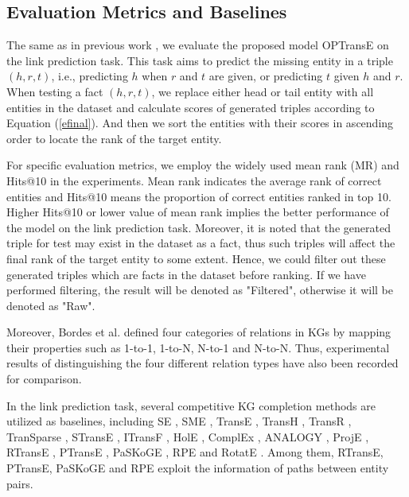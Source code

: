 \documentclass[11pt,a4paper]{article}
\begin{document}
\subsection{Evaluation Metrics and Baselines}

The same as in previous work
\cite{bordes2013translating,nguyen2016stranse}, we evaluate the
proposed model OPTransE on the link prediction task. This task aims
to predict the missing entity in a triple $(h,r,t)$, i.e.,
predicting ${h}$ when ${r}$ and ${t}$ are given, or predicting ${t}$
given ${h}$ and ${r}$. When testing a fact $(h,r,t)$, we replace
either head or tail entity with all entities in the dataset and
calculate scores of generated triples according to Equation
(\ref{efinal}). And then we sort the entities with their scores in
ascending order to locate the rank of the target entity.

For specific evaluation metrics, we employ the widely used mean rank
(MR) and Hits@10 in the experiments. Mean rank indicates the average
rank of correct entities and Hits@10 means the proportion of correct
entities ranked in top 10. Higher Hits@10 or lower value of mean
rank implies the better performance of the model on the link
prediction task. Moreover, it is noted that the generated triple for
test may exist in the dataset as a fact, thus such triples will
affect the final rank of the target entity to some extent. Hence, we
could filter out these generated triples which are facts in the
dataset before ranking. If we have performed filtering, the result
will be denoted as "Filtered", otherwise it will be denoted as
"Raw".

Moreover, Bordes et al.  defined
four categories of relations in KGs by mapping their properties such
as 1-to-1, 1-to-N, N-to-1 and N-to-N. Thus, experimental results of
distinguishing  the four different relation types have also been
recorded for comparison.

In the link prediction task, several competitive KG completion
methods are utilized as baselines, including SE
\cite{bordes2011learning}, SME \cite{bordes2014semantic}, TransE
\cite{bordes2013translating}, TransH \cite{wang2014knowledge},
TransR \cite{lin2015learning}, TranSparse \cite{ji2016knowledge},
STransE \cite{nguyen2016stranse}, ITransF
\cite{xie2017interpretable}, HolE \cite{nickel2016holographic},
ComplEx \cite{trouillon2016complex}, ANALOGY
\cite{liu2017analogical}, ProjE \cite{shi2017proje}, RTransE
\cite{garcia2015composing}, PTransE \cite{lin2015modeling}, PaSKoGE
\cite{jia2018path}, RPE \cite{lin2018relation} and RotatE \cite{sun2019rotate}. Among them,
RTransE, PTransE, PaSKoGE and RPE exploit the information of
paths between entity pairs.
\end{document}
